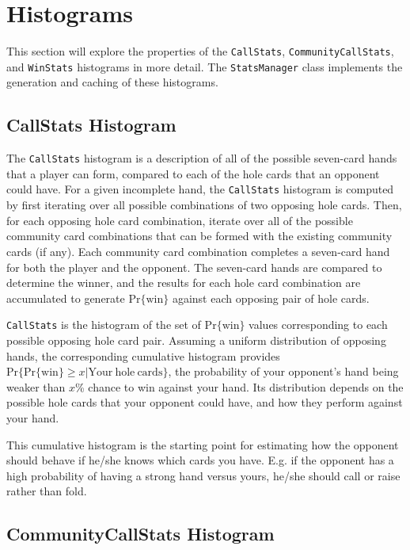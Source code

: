 \section{Histograms}

This section will explore the properties of the \texttt{CallStats}, \texttt{CommunityCallStats}, and \texttt{WinStats} histograms in more detail.
The \texttt{StatsManager} class implements the generation and caching of these histograms.

\subsection{CallStats Histogram}
\label{sec:CallStats}

The \texttt{CallStats} histogram is a description of all of the possible seven-card hands that a player can form, compared to each of the hole cards that an opponent could have.
For a given incomplete hand, the \texttt{CallStats} histogram is computed by first iterating over all possible combinations of two opposing hole cards.
Then, for each opposing hole card combination, iterate over all of the possible community card combinations that can be formed with the existing community cards (if any).
Each community card combination completes a seven-card hand for both the player and the opponent.
The seven-card hands are compared to determine the winner, and the results for each hole card combination are accumulated to generate $\mathrm{Pr\{win\}}$ against each opposing pair of hole cards.

\texttt{CallStats} is the histogram of the set of $\mathrm{Pr\{win\}}$ values corresponding to each possible opposing hole card pair.
Assuming a uniform distribution of opposing hands, the corresponding cumulative histogram provides $\mathrm{Pr}\{\mathrm{Pr\{win\}} \ge x|\mathrm{Your\:hole\:cards}\}$, the probability of your opponent's hand being weaker than $x$\% chance to win against your hand.
Its distribution depends on the possible hole cards that your opponent could have, and how they perform against your hand.

This cumulative histogram is the starting point for estimating how the opponent should behave if he/she knows which cards you have.
E.g. if the opponent has a high probability of having a strong hand versus yours, he/she should call or raise rather than fold.


\subsection{CommunityCallStats Histogram}
\label{sec:CommunityCallStats}

